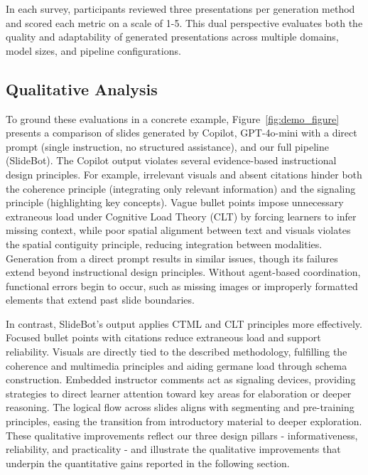 \documentclass[letterpaper]{article} %
\begin{document}
In each survey, participants reviewed three presentations per generation method and scored each metric on a scale of 1-5. This dual perspective evaluates both the quality and adaptability of generated presentations across multiple domains, model sizes, and pipeline configurations.



\subsection{Qualitative Analysis}

To ground these evaluations in a concrete example, Figure~\ref{fig:demo_figure} presents a comparison of slides generated by Copilot, GPT-4o-mini with a direct prompt (single instruction, no structured assistance), and our full pipeline (SlideBot). The Copilot output violates several evidence-based instructional design principles. For example, irrelevant visuals and absent citations hinder both the coherence principle (integrating only relevant information) and the signaling principle (highlighting key concepts). Vague bullet points impose unnecessary extraneous load under Cognitive Load Theory (CLT) by forcing learners to infer missing context, while poor spatial alignment between text and visuals violates the spatial contiguity principle, reducing integration between modalities. Generation from a direct prompt results in similar issues, though its failures extend beyond instructional design principles. Without agent-based coordination, functional errors begin to occur, such as missing images or improperly formatted elements that extend past slide boundaries.


In contrast, SlideBot’s output applies CTML and CLT principles more effectively. Focused bullet points with citations reduce extraneous load and support reliability. Visuals are directly tied to the described methodology, fulfilling the coherence and multimedia principles and aiding germane load through schema construction. Embedded instructor comments act as signaling devices, providing strategies to direct learner attention toward key areas for elaboration or deeper reasoning. The logical flow across slides aligns with segmenting and pre-training principles, easing the transition from introductory material to deeper exploration. These qualitative improvements reflect our three design pillars - informativeness, reliability, and practicality - and illustrate the qualitative improvements that underpin the quantitative gains reported in the following section.
\end{document}
